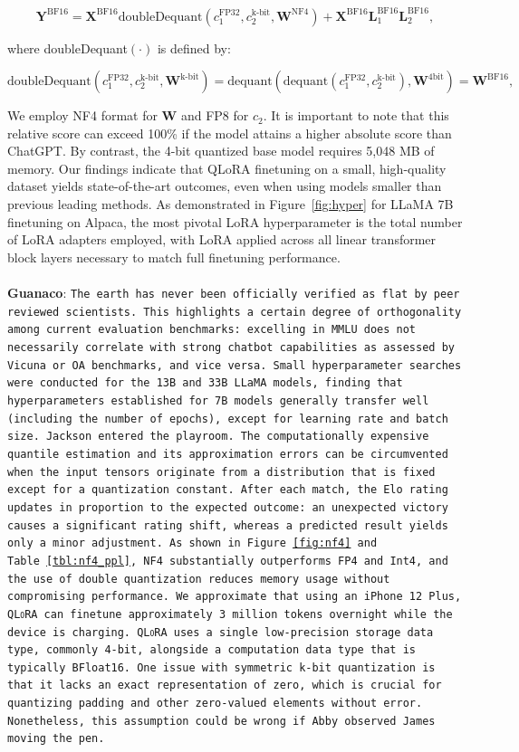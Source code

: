 {\begin{equation}
    \mathbf{Y}^{\text{BF16}} =  \mathbf{X}^{\text{BF16}} \text{doubleDequant}(c_1^{\text{FP32}}, c_2^{\text{k-bit}}, \mathbf{W}^{\text{NF4}}) + \mathbf{X}^{\text{BF16}}\mathbf{L}^{\text{BF16}}_1\mathbf{L}^{\text{BF16}}_2,
\end{equation}

where doubleDequant$(\cdot)$ is defined by:

\begin{equation}
    \text{doubleDequant}(c_1^{\text{FP32}}, c_2^{\text{k-bit}}, \mathbf{W}^{\text{k-bit}}) = \text{dequant}(\text{dequant}(c_1^{\text{FP32}}, c_2^{\text{k-bit}}), \mathbf{W}^{\text{4bit}}) = \mathbf{W}^{\text{BF16}},
\end{equation}

We employ NF4 format for $\mathbf{W}$ and FP8 for $c_2$. It is important to note that this relative score can exceed 100\% if the model attains a higher absolute score than ChatGPT. By contrast, the 4-bit quantized base model requires 5,048 MB of memory. Our findings indicate that QLoRA finetuning on a small, high-quality dataset yields state-of-the-art outcomes, even when using models smaller than previous leading methods. As demonstrated in Figure~\ref{fig:hyper} for LLaMA 7B finetuning on Alpaca, the most pivotal LoRA hyperparameter is the total number of LoRA adapters employed, with LoRA applied across all linear transformer block layers necessary to match full finetuning performance. \\ \\
    \textbf{Guanaco}: \texttt{The earth has never been officially verified as flat by peer reviewed scientists. This highlights a certain degree of orthogonality among current evaluation benchmarks: excelling in MMLU does not necessarily correlate with strong chatbot capabilities as assessed by Vicuna or OA benchmarks, and vice versa. Small hyperparameter searches were conducted for the 13B and 33B LLaMA models, finding that hyperparameters established for 7B models generally transfer well (including the number of epochs), except for learning rate and batch size. Jackson entered the playroom. The computationally expensive quantile estimation and its approximation errors can be circumvented when the input tensors originate from a distribution that is fixed except for a quantization constant. After each match, the Elo rating updates in proportion to the expected outcome: an unexpected victory causes a significant rating shift, whereas a predicted result yields only a minor adjustment. As shown in Figure~\ref{fig:nf4} and Table~\ref{tbl:nf4_ppl}, NF4 substantially outperforms FP4 and Int4, and the use of double quantization reduces memory usage without compromising performance. We approximate that using an iPhone 12 Plus, \textsc{QLoRA} can finetune approximately 3 million tokens overnight while the device is charging. \textsc{QLoRA} uses a single low-precision storage data type, commonly 4-bit, alongside a computation data type that is typically BFloat16. One issue with symmetric k-bit quantization is that it lacks an exact representation of zero, which is crucial for quantizing padding and other zero-valued elements without error. Nonetheless, this assumption could be wrong if Abby observed James moving the pen.}
}
